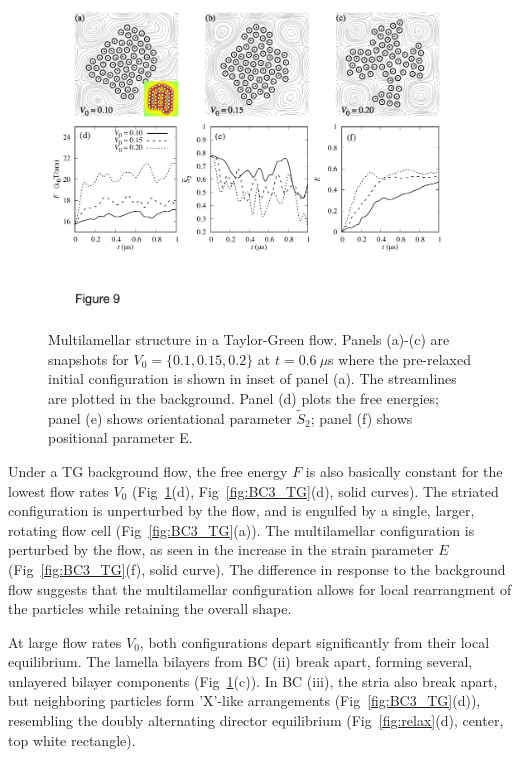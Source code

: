 \documentclass[prb,preprint,showpacs,preprintnumbers,amsmath,amssymb,longbibliography]{revtex4-1}
\begin{document}
\begin{figure}
  \begin{center}
\includegraphics[width=1.0\textwidth]{Figures/Figure9.pdf}    
  \end{center}
  \vspace{-20pt}  
  \caption{\label{fig:BC2_TG} 
Multilamellar structure in a Taylor-Green flow. Panels (a)-(c) are snapshots for $V_0 = \{0.1, 0.15, 0.2\}$ at $t=0.6\ \mu$s where the pre-relaxed initial configuration is shown in inset of panel (a). The streamlines are plotted in the background.
Panel (d) plots the free energies; panel (e) shows orientational parameter $\tilde{S}_2$; panel (f) shows positional parameter E.
 }
\end{figure}


Under a TG background flow, the free energy $F$ 
is also basically constant for the lowest flow rates $V_0$
(Fig~\ref{fig:BC2_TG}(d), Fig~\ref{fig:BC3_TG}(d), solid curves).
The striated configuration is unperturbed by the flow, and is engulfed by a single,
larger, rotating flow cell
(Fig~\ref{fig:BC3_TG}(a)). 
The multilamellar configuration is perturbed by the flow,
as seen in the increase in
the strain parameter $E$ (Fig~\ref{fig:BC3_TG}(f), solid curve).
The difference in response to the background flow
suggests that the multilamellar configuration
allows for local rearrangment of the particles while retaining the overall shape.

At large flow rates $V_0$, both configurations depart significantly from their local
equilibrium.  The lamella bilayers from BC (ii) break apart, forming several,
unlayered bilayer components (Fig~\ref{fig:BC2_TG}(c)).
In BC (iii), the stria also break apart, but neighboring particles form
'X'-like arrangements (Fig~\ref{fig:BC3_TG}(d)), resembling the doubly alternating
director equilibrium (Fig~\ref{fig:relax}(d), center, top white rectangle).
\end{document}
